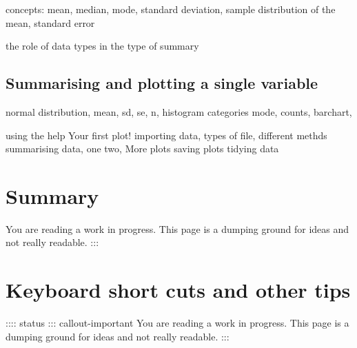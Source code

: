\documentclass[
  letterpaper,
  DIV=11,
  numbers=noendperiod]{scrreprt}
\begin{document}
concepts: mean, median, mode, standard deviation, sample distribution of
the mean, standard error

the role of data types in the type of summary

\hypertarget{summarising-and-plotting-a-single-variable}{%
\section{Summarising and plotting a single
variable}\label{summarising-and-plotting-a-single-variable}}

normal distribution, mean, sd, se, n, histogram categories mode, counts,
barchart,

using the help Your first plot! importing data, types of file, different
methds summarising data, one two, More plots saving plots tidying data


\hypertarget{summary-1}{%
\chapter{Summary}\label{summary-1}}

\begin{tcolorbox}[enhanced jigsaw, opacitybacktitle=0.6, toprule=.15mm, arc=.35mm, colback=white, colframe=quarto-callout-important-color-frame, opacityback=0, titlerule=0mm, colbacktitle=quarto-callout-important-color!10!white, leftrule=.75mm, breakable, bottomtitle=1mm, toptitle=1mm, title=\textcolor{quarto-callout-important-color}{\faExclamation}\hspace{0.5em}{Important}, rightrule=.15mm, bottomrule=.15mm, coltitle=black, left=2mm]

You are reading a work in progress. This page is a dumping ground for
ideas and not really readable. :::

\end{tcolorbox}


\hypertarget{keyboard-short-cuts-and-other-tips}{%
\chapter{Keyboard short cuts and other
tips}\label{keyboard-short-cuts-and-other-tips}}

:::: status ::: callout-important You are reading a work in progress.
This page is a dumping ground for ideas and not really readable. :::
\end{document}
